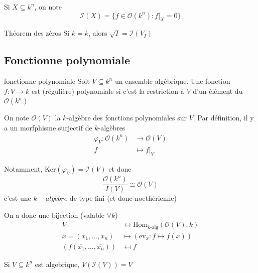 \begin{note}[zione]
    Si \(X \subseteq k^{n} \), on note
    \[
      \mathcal{I}{(X)} = \{f \in \mathcal{O}{(k^{n})} : f|_X = 0\} 
    \]
\end{note}

\begin{theorem}{Théorem des zéros}
    Si \(k = \overline{k}\), alors \(\sqrt{I} = \mathcal{I}{(V_I)}\)  
\end{theorem}

\subsection{Fonctionne polynomiale}

\begin{definition}{fonctionne polynomiale}
    Soit \(V \subseteq k^{n} \) un ensemble algèbrique. Une fonction \(f : V \to
    k\) est (régulière) polynomiale si c'est la restriction à \(V\) d'un élément
    du \(\mathcal{O}{(k^{n})}\) 
\end{definition}

\begin{remark}{}
    On note \(\mathcal{O}{(V)}\) la \(k\)-algèbre des fonctions polynomiales sur
    \(V\).
    Par définition, il y a un morfphisme surjectif de \(k\)-algèbres 
    \begin{align*}
        \varphi_V : \mathcal{O}{(k^{n})} &\to \mathcal{O}{(V)}\\
        f &\mapsto f|_V
    \end{align*}

    Notamment, \(\mathrm{Ker}{(\varphi_V )} = \mathcal{I}{(V)}\) et donc
    \[
     \frac{\mathcal{O}{(k^{n})}}{I{(V)}} \cong \mathcal{O}{(V)} 
    \]
    c'est une \(k-algèbre\) de type fini (et donc noethérienne)
\end{remark}

On a donc une bijection (valable \(\forall k\))
\begin{align*}
    V &\leftrightarrow \mathrm{Hom}_{k\text{-alg}} {(\mathcal{O}{(V)},k)} \\
    x = {(x_{1}, \dots, x_{n})} &\mapsto {(\mathrm{ev}_x : f \mapsto f{(x)})}\\
    {(f{(\overline{x_{1}}, \dots, \overline{x_{n}})})} &\mapsfrom f
\end{align*}
\begin{eser}{}
Si \(V \subseteq k^{n} \) est algebrique, \(V{(\mathcal{I}{(V)})} = V\) 
\end{eser}

